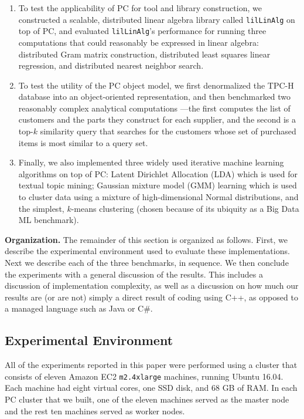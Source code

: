 \begin {enumerate}
\item To test the applicability of PC for tool and library construction, we constructed a scalable, distributed
linear algebra library
called \texttt{lilLinAlg} on top of PC, and evaluated \texttt{lilLinAlg}'s performance for running three
computations that could reasonably be expressed in linear algebra: distributed Gram matrix construction, 
distributed least squares linear regression, and distributed nearest neighbor search.

\item To test the utility of the PC object model, we first denormalized the TPC-H database \cite{council2008tpc} into an object-oriented 
representation, and then benchmarked two reasonably complex 
analytical computations ---the
first computes the list of customers and the parts they construct for each supplier, and the
second is a top-$k$ similarity query that searches for the customers whose set of purchased items is most similar
to a query set.

\item Finally, we also implemented three widely used
  iterative machine learning algorithms on top of PC: Latent Dirichlet Allocation (LDA) which is used for
  textual topic mining;
  Gaussian mixture model (GMM) learning which is used to cluster data using a mixture of high-dimensional Normal
  distributions, and the simplest, $k$-means clustering (chosen because of its ubiquity as a Big Data ML benchmark).
\end {enumerate}

\vspace{5 pt}
\noindent
\textbf{Organization.}  The remainder of this section is organized as follows.  First, we describe the experimental
environment used to evaluate these implementations.  
Next we describe each of the three benchmarks, in sequence. We then conclude the experiments with a general
discussion of the results.  This includes a discussion of implementation complexity, as well as a discussion on how much
our results are (or are not) simply a direct result of coding using C++, as opposed to a managed language such as Java or
C\#.

\subsection {Experimental Environment}

All of the experiments reported in this paper were performed using a
cluster that consists of eleven Amazon EC2 \texttt{m2.4xlarge} machines,
running Ubuntu 16.04. Each machine had eight virtual cores, one SSD
disk, and 68 GB of RAM. In each PC cluster that we built, one of the eleven machines served as the master
node and the rest ten machines served as worker nodes.

